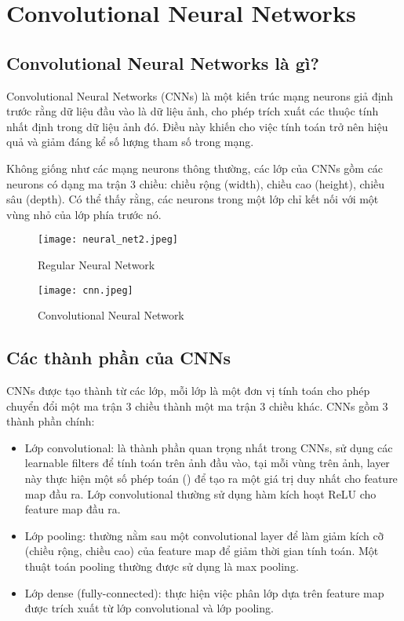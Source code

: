 \documentclass[../thesis.tex]{subfiles}
\begin{document}
\section{Convolutional Neural Networks}

\subsection{Convolutional Neural Networks là gì?}

Convolutional Neural Networks (CNNs) \cite{cs231n} là một kiến trúc mạng neurons giả định trước rằng dữ liệu đầu vào là dữ liệu ảnh, cho phép trích xuất các thuộc tính nhất định trong dữ liệu ảnh đó. Điều này khiến cho việc tính toán trở nên hiệu quả và giảm đáng kể số lượng tham số trong mạng.

Không giống như các mạng neurons thông thường, các lớp của CNNs gồm các neurons có dạng ma trận 3 chiều: chiều rộng (width), chiều cao (height), chiều sâu (depth). Có thể thấy rằng, các neurons trong một lớp chỉ kết nối với một vùng nhỏ của lớp phía trước nó. 
\begin{figure}[!htb]
	\begin{minipage}{0.48\textwidth}
		\centering
		\texttt{[image: neural\_net2.jpeg]}
		\caption{Regular Neural Network}\label{Fig:NN}
	\end{minipage}\hfill
	\begin {minipage}{0.48\textwidth}
		\centering
		\texttt{[image: cnn.jpeg]}
		\caption{Convolutional Neural Network}\label{Fig:CNN}
	\end{minipage}
\end{figure}

\subsection{Các thành phần của CNNs}

CNNs được tạo thành từ các lớp, mỗi lớp là một đơn vị tính toán cho phép chuyển đổi một ma trận 3 chiều thành một ma trận 3 chiều khác. CNNs gồm 3 thành phần chính\cite{tfcnn}: 

\begin{itemize}
  \item Lớp convolutional: là thành phần quan trọng nhất trong CNNs, sử dụng các learnable filters để tính toán trên ảnh đầu vào, tại mỗi vùng trên ảnh, layer này thực hiện một số phép toán () để tạo ra một giá trị duy nhất cho feature map đầu ra. Lớp convolutional thường sử dụng hàm kích hoạt ReLU cho feature map đầu ra.
  \item Lớp pooling: thường nằm sau một convolutional layer để làm giảm kích cỡ (chiều rộng, chiều cao) của feature map để giảm thời gian tính toán. Một thuật toán pooling thường được sử dụng là max pooling.
  \item Lớp dense (fully-connected): thực hiện việc phân lớp dựa trên feature map được trích xuất từ lớp convolutional và lớp pooling.
\end{itemize}
\end{document}
